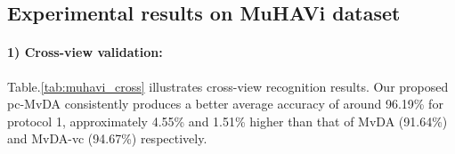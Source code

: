 
\subsection{Experimental results on MuHAVi dataset}
    \paragraph{1) Cross-view validation:} Table.\ref{tab:muhavi_cross} illustrates cross-view recognition results. Our proposed pc-MvDA consistently produces a better average accuracy of around 96.19\% for protocol 1, approximately 4.55\% and 1.51\% higher than that of MvDA (91.64\%) and MvDA-vc (94.67\%) respectively.

    \begin{table}[htbp]
    \centering
    \caption{Cross-view recognition comparison on MuHAVi dataset}
    \label{tab:muhavi_cross}
    \end{table}


